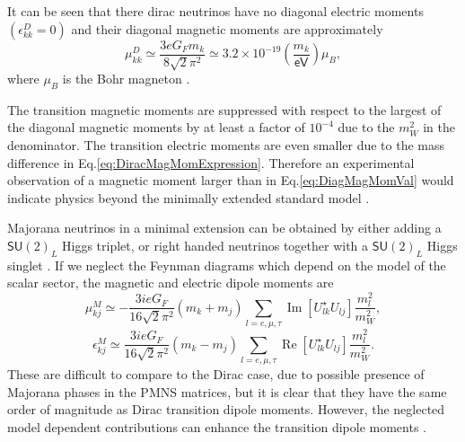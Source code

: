It can be seen that there dirac neutrinos have no diagonal electric moments $\left(\epsilon_{kk}^D=0\right)$ and their diagonal magnetic moments are approximately
\begin{equation}\label{eq:DiagMagMomVal}
\mu_{kk}^D\simeq\frac{3eG_Fm_k}{8\sqrt{2}\pi^2}\simeq 3.2\times 10^{-19}\left(\frac{m_k}{\textsf{eV}}\right)\mu_B,
\end{equation}
where $\mu_B$ is the Bohr magneton \cite{nuElmagInt2015.pdf}.

The transition magnetic moments are suppressed with respect to the largest of the diagonal magnetic moments by at least a factor of $10^{-4}$ due to the $m_W^2$ in the denominator. The transition electric moments are even smaller due to the mass difference in Eq.\ref{eq:DiracMagMomExpression}. Therefore an experimental observation of a magnetic moment larger than in Eq.\ref{eq:DiagMagMomVal} would indicate physics beyond the minimally extended standard model \cite{nuElmagInt2015.pdf,nuMMMajoranaBounds2006.pdf}.

Majorana neutrinos in a minimal extension can be obtained by either adding a $\textsf{SU}\left(2\right)_L$ Higgs triplet, or right handed neutrinos together with a $\textsf{SU}\left(2\right)_L$ Higgs singlet \cite{nuElmagInt2015.pdf}. If we neglect the Feynman diagrams which depend on the model of the scalar sector, the magnetic and electric dipole moments are
\begin{equation}
\mu_{kj}^M\simeq -\frac{3ieG_F}{16\sqrt{2}\pi^2}\left(m_k+m_j\right)\sum_{l=e,\mu ,\tau}\operatorname{Im}\left[U^{\star}_{lk}U_{lj}\right]\frac{m_l^2}{m_W^2},
\end{equation}
\begin{equation}
\epsilon_{kj}^M\simeq \frac{3ieG_F}{16\sqrt{2}\pi^2}\left(m_k-m_j\right)\sum_{l=e,\mu ,\tau}\operatorname{Re}\left[U^{\star}_{lk}U_{lj}\right]\frac{m_l^2}{m_W^2}.
\end{equation}
These are difficult to compare to the Dirac case, due to possible presence of Majorana phases in the PMNS matrices, but it is clear that they have the same order of magnitude as Dirac transition dipole moments. However, the neglected model dependent contributions can enhance the transition dipole moments \cite{nuElmagInt2015.pdf}.

